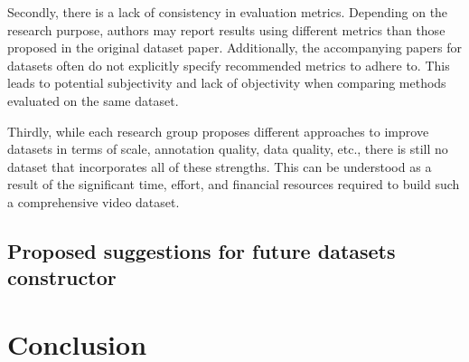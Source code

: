 \documentclass[a4paper]{article}
\begin{document}
Secondly, there is a lack of consistency in evaluation metrics. Depending on the research purpose, authors may report results using different metrics than those proposed in the original dataset paper. Additionally, the accompanying papers for datasets often do not explicitly specify recommended metrics to adhere to. This leads to potential subjectivity and lack of objectivity when comparing methods evaluated on the same dataset.

Thirdly, while each research group proposes different approaches to improve datasets in terms of scale, annotation quality, data quality, etc., there is still no dataset that incorporates all of these strengths. This can be understood as a result of the significant time, effort, and financial resources required to build such a comprehensive video dataset.

\subsection{Proposed suggestions for future datasets constructor}

\section{Conclusion}

\FloatBarrier


\end{document}
